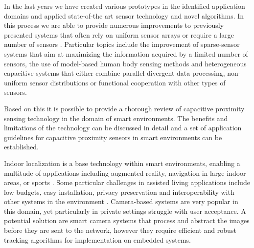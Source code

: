 In the last years we have created various prototypes in the identified application domains and applied state-of-the art sensor technology and novel algorithms. In this process we are able to provide numerous improvements to previously presented systems that often rely on uniform sensor arrays \cite{Smith1996a} or require a large number of sensors \cite{rekimoto2002smartskin}. Particular topics include the improvement of sparse-sensor systems that aim at maximizing the information acquired by a limited number of sensors, the use of model-based human body sensing methods and heterogeneous capacitive systems that either combine parallel divergent data processing, non-uniform sensor distributions or functional cooperation with other types of sensors. 

Based on this it is possible to provide a thorough review of capacitive proximity sensing technology in the domain of smart environments. The benefits and limitations of the technology can be discussed in detail and a set of application guidelines for capacitive proximity sensors in smart environments can be established.

Indoor localization is a base technology within smart environments, enabling a multitude of applications including augmented reality, navigation in large indoor areas, or sports \cite{thomas2000arquake, ingram2004ultrawideband, leser2011local}. Some particular challenges in assisted living applications include low budgets, easy installation, privacy preservation and interoperability with other systems in the environment \cite{chessa_eval}. Camera-based systems are very popular in this domain, yet particularly in private settings struggle with user acceptance. A potential solution are smart camera systems that process and abstract the images before they are sent to the network, however they require efficient and robust tracking algorithms for implementation on embedded systems. 
